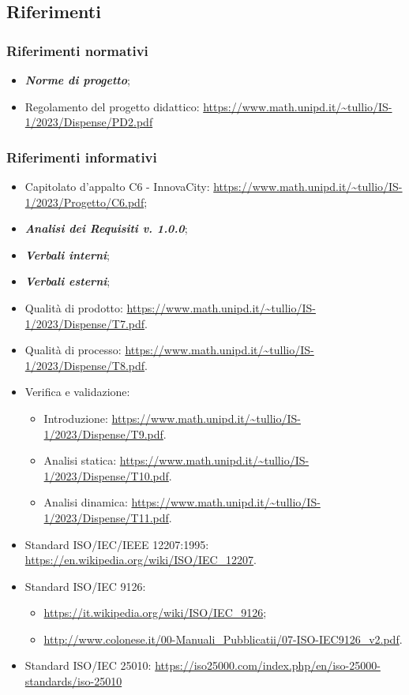\subsection{Riferimenti}
\subsubsection{Riferimenti normativi}
\begin{itemize}
    \item \textbf{\textit{Norme di progetto}};
    \item Regolamento del progetto didattico: \url{https://www.math.unipd.it/~tullio/IS-1/2023/Dispense/PD2.pdf}
\end{itemize}
\subsubsection{Riferimenti informativi}
\begin{itemize}
    \item Capitolato d’appalto C6 - InnovaCity: \url{https://www.math.unipd.it/~tullio/IS-1/2023/Progetto/C6.pdf};
    \item \textbf{\textit{Analisi dei Requisiti v. 1.0.0}};
    \item \textbf{\textit{Verbali interni}};
    \item \textbf{\textit{Verbali esterni}};
    \item Qualità di prodotto: \url{https://www.math.unipd.it/~tullio/IS-1/2023/Dispense/T7.pdf}.
    \item Qualità di processo: \url{https://www.math.unipd.it/~tullio/IS-1/2023/Dispense/T8.pdf}.
    \item Verifica e validazione: \begin{itemize}
    \item Introduzione: \url{https://www.math.unipd.it/~tullio/IS-1/2023/Dispense/T9.pdf}.
    \item Analisi statica: \url{https://www.math.unipd.it/~tullio/IS-1/2023/Dispense/T10.pdf}.
    \item Analisi dinamica: \url{https://www.math.unipd.it/~tullio/IS-1/2023/Dispense/T11.pdf}.
    \end{itemize}
    \item Standard ISO/IEC/IEEE 12207:1995: \url{https://en.wikipedia.org/wiki/ISO/IEC_12207}.
    \item Standard ISO/IEC 9126: \begin{itemize}
        \item \url{https://it.wikipedia.org/wiki/ISO/IEC_9126};
        \item \url{http://www.colonese.it/00-Manuali_Pubblicatii/07-ISO-IEC9126_v2.pdf}.
    \end{itemize}
    \item Standard ISO/IEC 25010: \url{https://iso25000.com/index.php/en/iso-25000-standards/iso-25010}
\end{itemize}
